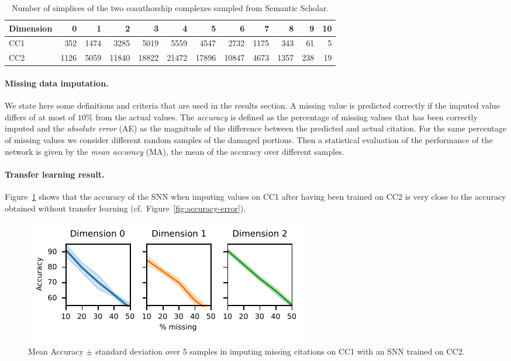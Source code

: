 \begin{table}[htbp]
  \centering
  \scriptsize{
  \begin{tabular}{lrrrrrrrrrrr}
    \toprule
    Dimension   & 0     & 1  & 2     & 3 & 4     & 5 & 6    & 7 & 8   & 9 & 10\\
    \midrule
    CC1 & 352  & 1474  & 3285  & 5019  & 5559  & 4547  & 2732  & 1175  & 343 & 61 & 5\\
    CC2 & 1126 & 5059 & 11840 & 18822 & 21472 & 17896  & 10847 & 4673 & 1357 & 238 & 19\\
    \bottomrule
  \end{tabular}}
  \vspace{2pt}
  \caption{%
  Number of simplices of the two coauthorship complexes sampled from Semantic Scholar.
  } \label{table:Simplices-coauthor}
\end{table}



\paragraph{Missing data imputation.}
We state here some definitions and criteria that are used in the results section.
A missing value is predicted correctly if the imputed value differs of at most of $10\%$ from the actual values. The \emph{accuracy} is defined as the percentage of missing values that has been correctly imputed and the \emph{absolute error} (AE) as the magnitude of the difference between the predicted and actual citation.
For the same percentage of missing values we consider different random samples of the damaged portions. Then a statistical evaluation of the performance of the network is given by the \emph{mean accuracy} (MA), the mean of the accuracy over different samples.

\paragraph{Transfer learning result.} Figure~\ref{fig:transfer-learning} shows that the accuracy of the SNN when imputing values on CC1 after having been trained on CC2 is very close to the accuracy obtained without transfer learning (cf.\ Figure~\ref{fig:accuracy-error}).

\begin{figure}[htbp]
  \centering
  \includegraphics{figures/foo-transfer.pdf}
  \caption{Mean Accuracy $\pm$ standard deviation over 5 samples in imputing missing citations on CC1 with an SNN trained on CC2.} \label{fig:transfer-learning}
\end{figure}

